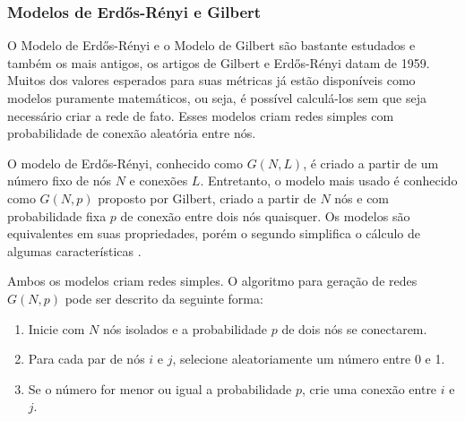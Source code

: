 \documentclass[12pt,a4paper]{article}
\theoremstyle{hypo}
\begin{document}

\subsubsection{Modelos de Erdős-Rényi e Gilbert}

O Modelo de Erdős-Rényi e o Modelo de Gilbert são bastante estudados e também os mais antigos, os artigos de Gilbert e Erdős-Rényi datam de 1959. Muitos dos valores esperados para suas métricas já estão disponíveis como modelos puramente matemáticos, ou seja, é possível calculá-los sem que seja necessário criar a rede de fato. Esses modelos criam redes simples com probabilidade de conexão aleatória entre nós.

O modelo de Erdős-Rényi, conhecido como $G(N,L)$, é criado a partir de um número fixo de nós $N$ e conexões $L$. Entretanto, o modelo mais usado é conhecido como $G(N,p)$ proposto por Gilbert, criado a partir de $N$ nós e com probabilidade fixa $p$ de conexão entre dois nós quaisquer. Os modelos são equivalentes em suas propriedades, porém o segundo simplifica o cálculo de algumas características \cite{Barabasi2016-rn}.

Ambos os modelos criam redes simples. O algoritmo para geração de redes $G(N, p)$ pode ser descrito da seguinte forma:

\begin{enumerate}
\item Inicie com $N$ nós isolados e a probabilidade $p$ de dois nós se conectarem.

\item Para cada par de nós $i$ e $j$, selecione aleatoriamente um número entre 0 e 1.

\item Se o número for menor ou igual a probabilidade $p$, crie uma conexão entre $i$ e $j$.
\end{enumerate}
\end{document}
